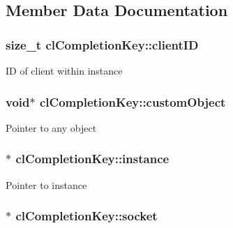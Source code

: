 \subsection{Member Data Documentation}
\hypertarget{classcl_completion_key_a512eecc783be96d6afe9a75c05c1ff18}{
\subsubsection[{clientID}]{\setlength{\rightskip}{0pt plus 5cm}size\_\-t {\bf clCompletionKey::clientID}}}
\label{classcl_completion_key_a512eecc783be96d6afe9a75c05c1ff18}
ID of client within instance \hypertarget{classcl_completion_key_ab1ef70c4d8194b9fd32f502dead2a371}{
\subsubsection[{customObject}]{\setlength{\rightskip}{0pt plus 5cm}void$\ast$ {\bf clCompletionKey::customObject}}}
\label{classcl_completion_key_ab1ef70c4d8194b9fd32f502dead2a371}
Pointer to any object \hypertarget{classcl_completion_key_aa35aa701d8a009f709509ba26ead3275}{
\subsubsection[{instance}]{$\ast$ {\bf clCompletionKey::instance}}}
\label{classcl_completion_key_aa35aa701d8a009f709509ba26ead3275}
Pointer to instance \hypertarget{classcl_completion_key_a96e8a44f37704779a1715f72fd712da2}{
\subsubsection[{socket}]{$\ast$ {\bf clCompletionKey::socket}}}
